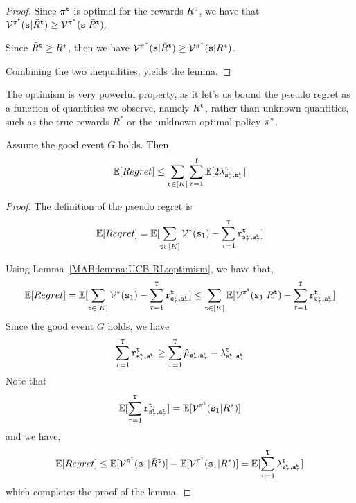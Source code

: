 \begin{proof}
    Since $\pi^{\tt t}$ is optimal for the rewards $\bar{R}^{\tt t}$, we have that $\mathcal{V}^{\pi^{\tt t}}({\tt s} | \bar{R}^{\tt t})\geq \mathcal{V}^{\pi^*}({\tt s} | \bar{R}^{\tt t})$.

Since $\bar{R}^{\tt t}\geq R^*$, then we have
$\mathcal{V}^{\pi^*}({\tt s} | \bar{R}^{\tt t})\geq \mathcal{V}^{\pi^*}({\tt s} | R^*)$.

Combining the two inequalities, yields the lemma.
\end{proof}

The optimism is very powerful property, as it let's us bound the pseudo regret as a function of quantities we observe, namely $\bar{R}^{\tt t}$, rather than unknown quantities, such as the true rewards $R^*$ or the unklnown optimal policy $\pi^*$.

\begin{lemma}
\label{MAB:lemma:UCB-RL:optimism}
Assume the good event $G$ holds. Then,
    \[
    \mathbb{E}[Regret] \leq \sum_{{\tt t}\in [K]} \sum_{\tau=1}^{\tt T}
    \mathbb{E}[2\lambda^{\tt t}_{{\tt s}^{\tt t}_\tau,{\tt a}^{\tt t}_\tau}]
    \]
\end{lemma}

\begin{proof}
    The definition of the pseudo regret is
    \[
    \mathbb{E}[Regret]= \mathbb{E}[\sum_{{\tt t}\in [K]} \mathcal{V}^*({\tt s}_1)-\sum_{\tau=1}^{\tt T} {\tt r}^{\tt t}_{{\tt s}_\tau^{\tt t},{\tt a}_\tau^{\tt t}}]
    \]

Using Lemma~\ref{MAB:lemma:UCB-RL:optimism}, we have that,
    \[
    \mathbb{E}[Regret]= \mathbb{E}[\sum_{{\tt t}\in [K]} \mathcal{V}^*({\tt s}_1)-\sum_{\tau=1}^{\tt T} {\tt r}^{\tt t}_{{\tt s}_\tau^{\tt t},{\tt a}_\tau^{\tt t}}]
    \leq
    \sum_{{\tt t}\in [K]}
    \mathbb{E}[\mathcal{V}^{\pi^{\tt t}}({\tt s}_1|\bar{R}^{\tt t})
    -\sum_{\tau=1}^{\tt T} {\tt r}^{\tt t}_{{\tt s}_\tau^{\tt t},{\tt a}_\tau^{\tt t}}]
    \]
Since the good event $G$ holds, we have 
\[
\sum_{\tau=1}^{\tt T} {\tt r}^{\tt t}_{{\tt s}_\tau^{\tt t},{\tt a}_\tau^{\tt t}} \geq \sum_{\tau=1}^{\tt T}
 \hat{\mu}_{{\tt s}_\tau^{\tt t},{\tt a}_\tau^{\tt t}}-\lambda^{\tt t}_{{\tt s}_\tau^{\tt t},{\tt a}_\tau^{\tt t}}
\]
Note that
\[
\mathbb{E}[\sum_{\tau=1}^{\tt T} {\tt r}^{\tt t}_{{\tt s}_\tau^{\tt t},{\tt a}_\tau^{\tt t}} ] =\mathbb{E}[\mathcal{V}^{\pi^{\tt t}}({\tt s}_1|R^*)]
\]
and we have,
\[
\mathbb{E}[Regret]\leq \mathbb{E}[\mathcal{V}^{\pi^{\tt t}}({\tt s}_1|\bar{R}^{\tt t})] -
\mathbb{E}[\mathcal{V}^{\pi^{\tt t}}({\tt s}_1|R^*)]=
\mathbb{E}[\sum_{\tau=1}^{\tt T} \lambda^{\tt t}_{{\tt s}_\tau^{\tt t},{\tt a}_\tau^{\tt t}} ]
\]
which completes the proof of the lemma.
\end{proof}


